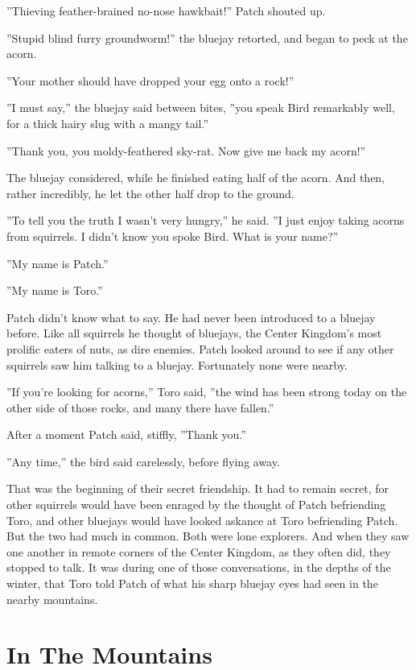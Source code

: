 \documentclass[12pt]{book}
\begin{document}
''Thieving feather-brained no-nose hawkbait!'' Patch shouted up.

''Stupid blind furry groundworm!'' the bluejay retorted, and began to peck at the acorn.

''Your mother should have dropped your egg onto a rock!''

''I must say,'' the bluejay said between bites, ''you speak Bird remarkably well, for a thick hairy slug with a mangy tail.''

''Thank you, you moldy-feathered sky-rat. Now give me back my acorn!''

The bluejay considered, while he finished eating half of the acorn. And then, rather incredibly, he let the other half drop to the ground.

''To tell you the truth I wasn't very hungry,'' he said. ''I just enjoy taking acorns from squirrels. I didn't know you spoke Bird. What is your name?''

''My name is Patch.''

''My name is Toro.''

Patch didn't know what to say. He had never been introduced to a bluejay before. Like all squirrels he thought of bluejays, the Center Kingdom's most prolific eaters of nuts, as dire enemies. Patch looked around to see if any other squirrels saw him talking to a bluejay. Fortunately none were nearby.

''If you're looking for acorns,'' Toro said, ''the wind has been strong today on the other side of those rocks, and many there have fallen.''

After a moment Patch said, stiffly, ''Thank you.''

''Any time,'' the bird said carelessly, before flying away.

That was the beginning of their secret friendship. It had to remain secret, for other squirrels would have been enraged by the thought of Patch befriending Toro, and other bluejays would have looked askance at Toro befriending Patch. But the two had much in common. Both were lone explorers. And when they saw one another in remote corners of the Center Kingdom, as they often did, they stopped to talk. It was during one of those conversations, in the depths of the winter, that Toro told Patch of what his sharp bluejay eyes had seen in the nearby mountains.


\section{In The Mountains}
\end{document}
